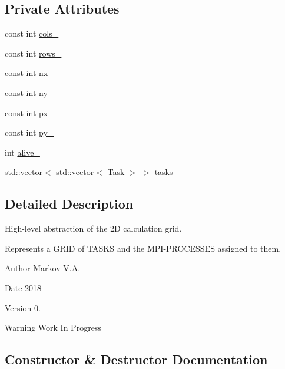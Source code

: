 \subsection*{Private Attributes}
\begin{DoxyCompactItemize}
\item 
const int \hyperlink{classGrid_a25c87f1b691be65760282b75fac9a487}{cols\+\_\+}
\item 
const int \hyperlink{classGrid_abb5a6798827020c44faeb1730cdb52fd}{rows\+\_\+}
\item 
const int \hyperlink{classGrid_af1915aaf156bbc0677d2f8853643fddb}{nx\+\_\+}
\item 
const int \hyperlink{classGrid_a017c2ce200149e3f6b9e1feec7432be3}{ny\+\_\+}
\item 
const int \hyperlink{classGrid_a1f71da29e1b573e02fe09300cf676267}{px\+\_\+}
\item 
const int \hyperlink{classGrid_aaf0567036eb876642fcd38eb3eb83181}{py\+\_\+}
\item 
int \hyperlink{classGrid_a878bac705a4a7e23d87bf74332a0c59a}{alive\+\_\+}
\item 
std\+::vector$<$ std\+::vector$<$ \hyperlink{classTask}{Task} $>$ $>$ \hyperlink{classGrid_a352418004dcff916bfa9b3cdbd8cf0a4}{tasks\+\_\+}
\end{DoxyCompactItemize}


\subsection{Detailed Description}
High-\/level abstraction of the 2D calculation grid. 

Represents a G\+R\+ID of T\+A\+S\+KS and the M\+P\+I-\/\+P\+R\+O\+C\+E\+S\+S\+ES assigned to them. \begin{DoxyAuthor}{Author}
Markov V.\+A. 
\end{DoxyAuthor}
\begin{DoxyDate}{Date}
2018 
\end{DoxyDate}
\begin{DoxyVersion}{Version}
0. 
\end{DoxyVersion}
\begin{DoxyWarning}{Warning}
Work In Progress 
\end{DoxyWarning}


\subsection{Constructor \& Destructor Documentation}
